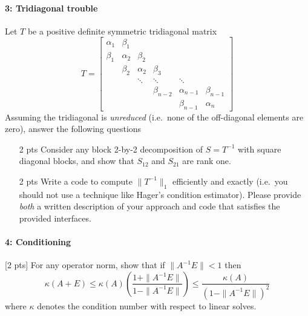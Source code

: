\documentclass[12pt, leqno]{article} %
\begin{document}
\paragraph*{3: Tridiagonal trouble}
Let $T$ be a positive definite symmetric tridiagonal matrix
\[
T = \begin{bmatrix}
  \alpha_1 & \beta_1 \\
  \beta_1 & \alpha_2 & \beta_2 \\
  & \beta_2 & \alpha_2 & \beta_3 \\
  & & \ddots & \ddots & \ddots \\
  & & & \beta_{n-2} & \alpha_{n-1} &\beta_{n-1} \\
  & & & & \beta_{n-1} & \alpha_n
  \end{bmatrix}
\]
Assuming the tridiagonal is {\em unreduced} (i.e.~none of the
off-diagonal elements are zero), answer the following questions
\begin{itemize}
\item[2 pts] Consider any block 2-by-2 decomposition of $S = T^{-1}$ with
  square diagonal blocks, and show that $S_{12}$ and $S_{21}$ are rank
  one.
\item[2 pts] Write a code to compute $\|T^{-1}\|_1$ efficiently and exactly
  (i.e.~you should not use a technique like Hager's condition estimator).
  Please provide {\em both} a written description of your approach and
  code that satisfies the provided interfaces.
\end{itemize}

\paragraph*{4: Conditioning}
[2 pts] For any operator norm, show that if $\|A^{-1} E\| < 1$ then
\[
  \kappa(A+E)
  \leq \kappa(A) \left( \frac{1+\|A^{-1} E\|}{1-\|A^{-1}E\|} \right)
  \leq \frac{\kappa(A)}{(1-\|A^{-1}E\|)^2}
\]
where $\kappa$ denotes the condition number with respect to linear solves.
\end{document}
